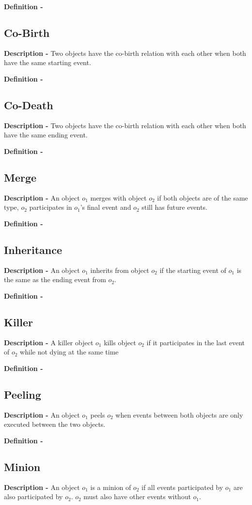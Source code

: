 \documentclass{article}
\begin{document}
\noindent\textbf{Definition -}
\subsection{Co-Birth}
\noindent\textbf{Description -} Two objects have the co-birth relation with each other when both have the same starting event.


\noindent\textbf{Definition -}
\subsection{Co-Death}
\noindent\textbf{Description -} Two objects have the co-birth relation with each other when both have the same ending event.


\noindent\textbf{Definition -}
\subsection{Merge}
\noindent\textbf{Description -} An object $o_1$ merges with object $o_2$ if both objects are of the same type, $o_2$ participates in $o_1$'s final event and $o_2$ still has future events.


\noindent\textbf{Definition -}
\subsection{Inheritance}
\noindent\textbf{Description -} An object $o_1$ inherits from object $o_2$ if the starting event of $o_1$ is the same as the ending event from $o_2$.

\noindent\textbf{Definition -}
\subsection{Killer}
\noindent\textbf{Description -} A killer object $o_1$ kills object $o_2$ if it participates in the last event of $o_2$ while not dying at the same time

\noindent\textbf{Definition -}
\subsection{Peeling}
\noindent\textbf{Description -} An object $o_1$ peels $o_2$ when events between both objects are only executed between the two objects.

\noindent\textbf{Definition -}
\subsection{Minion}
\noindent\textbf{Description -} An object $o_1$ is a minion of $o_2$ if all events participated by $o_1$ are also participated by $o_2$. $o_2$ must also have other events without $o_1$.
\end{document}
